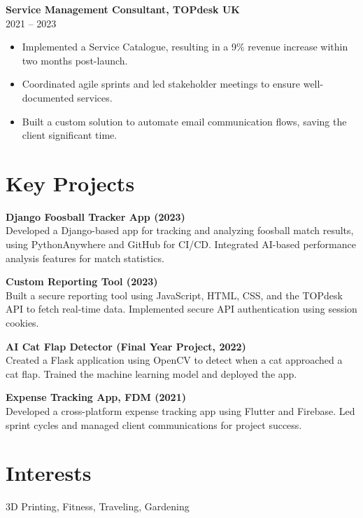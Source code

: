 \documentclass[a4paper,10pt]{article}
\begin{document}
\textbf{Service Management Consultant, TOPdesk UK} \\
2021 -- 2023 \\
\begin{itemize}[left=0.15cm]
    \item Implemented a Service Catalogue, resulting in a 9\% revenue increase within two months post-launch.
    \item Coordinated agile sprints and led stakeholder meetings to ensure well-documented services.
    \item Built a custom solution to automate email communication flows, saving the client significant time.
\end{itemize}

\vspace{0.3cm}

\section*{Key Projects}
\textbf{Django Foosball Tracker App (2023)} \\
Developed a Django-based app for tracking and analyzing foosball match results, using PythonAnywhere and GitHub for CI/CD. Integrated AI-based performance analysis features for match statistics.

\textbf{Custom Reporting Tool (2023)} \\
Built a secure reporting tool using JavaScript, HTML, CSS, and the TOPdesk API to fetch real-time data. Implemented secure API authentication using session cookies.

\textbf{AI Cat Flap Detector (Final Year Project, 2022)} \\
Created a Flask application using OpenCV to detect when a cat approached a cat flap. Trained the machine learning model and deployed the app.

\textbf{Expense Tracking App, FDM (2021)} \\
Developed a cross-platform expense tracking app using Flutter and Firebase. Led sprint cycles and managed client communications for project success.

\vspace{0.3cm}

\section*{Interests}
3D Printing, Fitness, Traveling, Gardening
\end{document}
